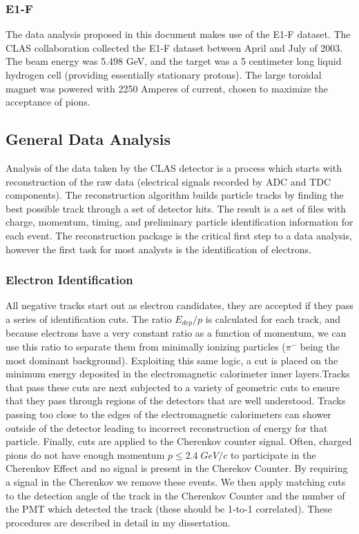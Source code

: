\subsubsection{E1-F}
The data analysis proposed in this document makes use of the E1-F dataset.  The CLAS collaboration collected the E1-F dataset between April and July of 2003.  The beam energy was 5.498 GeV, and the target was a 5 centimeter long liquid hydrogen cell (providing essentially stationary protons).  The large toroidal magnet was powered with 2250 Amperes of current, chosen to maximize the acceptance of pions.

\subsection{General Data Analysis}
Analysis of the data taken by the CLAS detector is a process which starts with reconstruction of the raw data (electrical signals recorded by ADC and TDC components).  The reconstruction algorithm builds particle tracks by finding the best possible track through a set of detector hits.  The result is a set of files with charge, momentum, timing, and preliminary particle identification information for each event.  The reconstruction package is the critical first step to a data analysis, however the first task for most analysts is the identification of electrons.

\subsubsection{Electron Identification}
All negative tracks start out as electron candidates, they are accepted if they pass a series of identification cuts. The ratio $E_{dep}/p$ is calculated for each track, and because electrons have a very constant ratio as a function of momentum, we can use this ratio to separate them from minimally ionizing particles ($\pi^{-}$ being the most dominant background).  Exploiting this same logic, a cut is placed on the minimum energy deposited in the electromagnetic calorimeter inner layers.Tracks that pass these cuts are next subjected to a variety of geometric cuts to ensure that they pass through regions of the detectors that are well understood.  Tracks passing too close to the edges of the electromagnetic calorimeters can shower outside of the detector leading to incorrect reconstruction of energy for that particle.  Finally, cuts are applied to the Cherenkov counter signal.  Often, charged pions do not have enough momentum $p \leq 2.4 \; GeV/c$ to participate in the Cherenkov Effect and no signal is present in the Cherekov Counter.  By requiring a signal in the Cherenkov we remove these events.  We then apply matching cuts to the detection angle of the track in the Cherenkov Counter and the number of the PMT which detected the track (these should be 1-to-1 correlated).  These procedures are described in detail in my dissertation.

